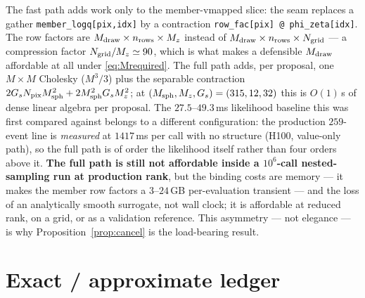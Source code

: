 The fast path adds work only to the member-vmapped slice: the seam replaces a
gather \verb|member_logq[pix,idx]| by a contraction
\verb|row_fac[pix] @ phi_zeta[idx]|.  The row factors are
$M_{\rm draw}\times n_{\rm rows}\times M_z$ instead of
$M_{\rm draw}\times n_{\rm rows}\times N_{\rm grid}$ --- a compression factor
$N_{\rm grid}/M_z\simeq90$, which is what makes a defensible $M_{\rm draw}$
affordable at all under \eqref{eq:Mrequired}.  The full path adds, per
proposal, one $M\times M$ Cholesky ($M^3/3$) plus the separable contraction
$2G_sN_{\rm pix}M_{\rm sph}^2+2M_{\rm sph}^2G_sM_z^2$; at
$(M_{\rm sph},M_z,G_s)=(315,12,32)$ this is $O(1)$\,s of dense linear algebra
per proposal.  The $27.5$--$49.3$\,ms likelihood baseline this was first compared
against belongs to a different configuration: the production $259$-event line is
\emph{measured} at $1417$\,ms per call with no structure (H100, value-only path),
so the full path is of order the likelihood itself rather than four orders above
it.  \textbf{The full path is still not affordable inside a $10^6$-call
nested-sampling run at production rank}, but the binding costs are memory --- it
makes the member row factors a $3$--$24$\,GB per-evaluation transient --- and the
loss of an analytically smooth surrogate, not wall clock; it is affordable at
reduced rank, on a grid, or as a validation reference.  This asymmetry --- not
elegance --- is why Proposition~\ref{prop:cancel} is the load-bearing result.

\section{Exact / approximate ledger}
\label{sec:ledger}

